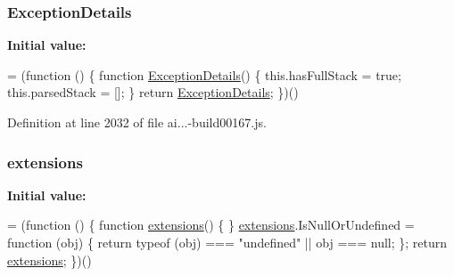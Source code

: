 \subsubsection[{\texorpdfstring{Exception\+Details}{ExceptionDetails}}]{ Exception\+Details}\hypertarget{obj_2_release_2_package_2_package_tmp_2_scripts_2ai_80_822_89-build00167_8js_a7f7a19d048e084f626f1c757d98f10a2}{}\label{obj_2_release_2_package_2_package_tmp_2_scripts_2ai_80_822_89-build00167_8js_a7f7a19d048e084f626f1c757d98f10a2}
{\bfseries Initial value\+:}
\begin{DoxyCode}
= (\textcolor{keyword}{function} () \{
        \textcolor{keyword}{function} \hyperlink{obj_2_release_2_package_2_package_tmp_2_scripts_2ai_80_822_89-build00167_8js_a7f7a19d048e084f626f1c757d98f10a2}{ExceptionDetails}() \{
            this.hasFullStack = \textcolor{keyword}{true};
            this.parsedStack = [];
        \}
        \textcolor{keywordflow}{return} \hyperlink{obj_2_release_2_package_2_package_tmp_2_scripts_2ai_80_822_89-build00167_8js_a7f7a19d048e084f626f1c757d98f10a2}{ExceptionDetails};
    \})()
\end{DoxyCode}


Definition at line 2032 of file ai...-\/build00167.\+js.

\subsubsection[{\texorpdfstring{extensions}{extensions}}]{ extensions}\hypertarget{obj_2_release_2_package_2_package_tmp_2_scripts_2ai_80_822_89-build00167_8js_a9ce4e17b92e5debce1c72727f3bdd551}{}\label{obj_2_release_2_package_2_package_tmp_2_scripts_2ai_80_822_89-build00167_8js_a9ce4e17b92e5debce1c72727f3bdd551}
{\bfseries Initial value\+:}
\begin{DoxyCode}
= (\textcolor{keyword}{function} () \{
            \textcolor{keyword}{function} \hyperlink{obj_2_release_2_package_2_package_tmp_2_scripts_2ai_80_822_89-build00167_8js_a9ce4e17b92e5debce1c72727f3bdd551}{extensions}() \{
            \}
            \hyperlink{obj_2_release_2_package_2_package_tmp_2_scripts_2ai_80_822_89-build00167_8js_a9ce4e17b92e5debce1c72727f3bdd551}{extensions}.IsNullOrUndefined = \textcolor{keyword}{function} (obj) \{
                \textcolor{keywordflow}{return} typeof (obj) === \textcolor{stringliteral}{"undefined"} || obj === null;
            \};
            \textcolor{keywordflow}{return} \hyperlink{obj_2_release_2_package_2_package_tmp_2_scripts_2ai_80_822_89-build00167_8js_a9ce4e17b92e5debce1c72727f3bdd551}{extensions};
        \})()
\end{DoxyCode}


